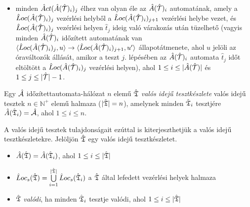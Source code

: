 \begin{definition}
\begin{itemize}
    \item minden $\hat{A}ct(\hat{A}(\hat{\mathcal{T}})_i)_j$ élhez van olyan éle az $\hat{A}(\hat{\mathcal{T}})_i$ automatának, amely a $\hat{L}oc(\hat{A}(\hat{\mathcal{T}})_i)_j$ vezérlési helyből a $\hat{L}oc(\hat{A}(\hat{\mathcal{T}})_i)_{j+1}$ vezérlési helybe vezet, és $\hat{L}oc(\hat{A}(\hat{\mathcal{T}})_i)_j$ vezérlési helyen $\hat{t}_j$ ideig való várakozás után tüzelhető (vagyis minden $\hat{A}(\hat{\mathcal{T}})_i$ időzített automatának van $\langle \hat{L}oc(\hat{A}(\hat{\mathcal{T}})_i)_j, u \rangle \rightarrow \langle \hat{L}oc(\hat{A}(\hat{\mathcal{T}})_i)_{j+1}, u' \rangle$ állapotátmenete, ahol $u$ jelöli az óraváltozók állását, amikor a teszt $j.$ lépésében az $\hat{A}(\hat{\mathcal{T}})_i$ automata $\hat{t}_j$ időt eltöltött a $\hat{L}oc(\hat{A}(\hat{\mathcal{T}})_i)_j$ vezérlési helyen), ahol $1 \leq i \leq |\hat{A}(\hat{\mathcal{T}})|$ és $1 \leq j \leq |\hat{\mathcal{T}}| - 1$.
\end{itemize}
\end{definition}

\begin{definition}
\label{TesztkészletKiterjesztés}
Egy $\hat{\mathcal{A}}$ időzítettautomata-hálózat $n$ elemű $\hat{\mathfrak{T}}$ \emph{valós idejű tesztkészlete} valós idejű tesztek $n \in \mathbb{N}^+$ elemű halmaza ($|\hat{\mathfrak{T}}| = n$), amelynek minden $\hat{\mathfrak{T}}_i$ tesztjére $\hat{A}(\hat{\mathfrak{T}}_i) = \hat{\mathcal{A}}$, ahol $1 \leq i \leq n$.
\end{definition}

A valós idejű tesztek tulajdonságait ezúttal is kiterjeszthetjük a valós idejű tesztkészletekre. Jelöljön $\hat{\mathfrak{T}}$ egy valós idejű tesztkészletet.
\begin{itemize}
    \item $\hat{A}(\hat{\mathfrak{T}}) = \hat{A}(\hat{\mathfrak{T}}_i)$, ahol $1 \leq i \leq |\hat{\mathfrak{T}}|$
    \item $\hat{L}oc_s(\hat{\mathfrak{T}}) = \bigcup\limits_{i = 1}^{|\hat{\mathfrak{T}}|} \hat{L}oc_s(\hat{\mathfrak{T}}_i)$ a $\hat{\mathfrak{T}}$ által lefedett vezérlési helyek halmaza
    \item $\hat{\mathfrak{T}}$ \emph{valódi}, ha minden $\hat{\mathfrak{T}}_i$ tesztje valódi, ahol $1 \leq i \leq |\hat{\mathfrak{T}}|$
\end{itemize}

